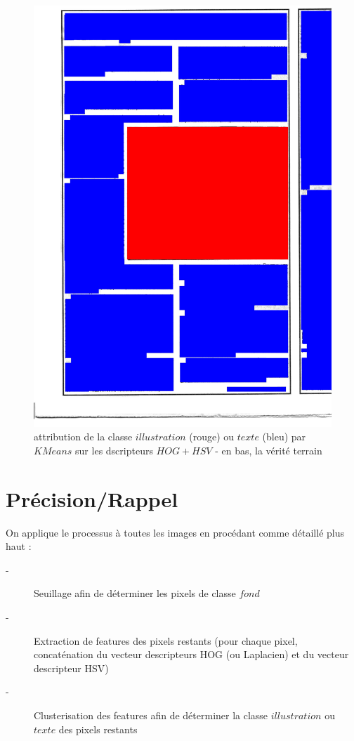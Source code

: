\documentclass{book}
\begin{document}
\begin{figure}[H]
\begin{center}
\includegraphics[scale=0.3]{images/1g_m.jpg}
\end{center}
\caption{attribution de la classe $illustration$ (rouge) ou $texte$ (bleu) par $KMeans$ sur les dscripteurs $HOG+HSV$ - en bas, la vérité terrain}
\label{resultat}
\end{figure}

\chapter{Précision/Rappel}

On applique le processus à toutes les images en procédant comme détaillé plus haut :

\begin{description}
 \item[-] Seuillage afin de déterminer les pixels de classe $fond$
 \item[-] Extraction de features des pixels restants (pour chaque pixel, concaténation du vecteur descripteurs HOG (ou Laplacien) et du vecteur descripteur HSV)
 \item[-] Clusterisation des features afin de déterminer la classe $illustration$ ou $texte$ des pixels restants
\end{description}
\end{document}
